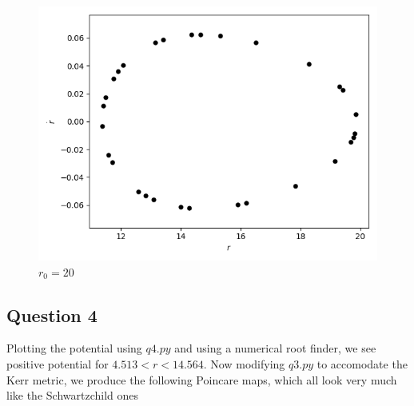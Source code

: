 \documentclass[10pt,a4paper]{report}
\begin{document}
\begin{figure}[!ht]
\begin{minipage}[b]{0.5\linewidth}
\centering
\includegraphics[width=\textwidth]{3b/r0=20,E=0.97,L=4.png}
\caption{$r_0=20$}
\label{fig:figure1}
\end{minipage}
\end{figure}



\newpage

\subsection*{Question 4}

Plotting the potential using $q4.py$ and using a numerical root finder, we see positive potential for $4.513<r<14.564$. Now modifying $q3.py$ to accomodate the Kerr metric, we produce the following Poincare maps, which all look very much like the Schwartzchild ones
\end{document}
